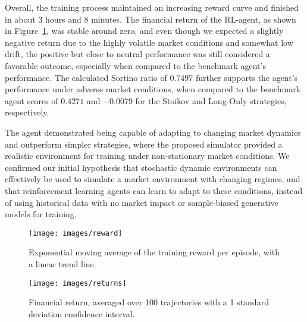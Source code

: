 
Overall, the training process maintained an increasing reward curve and finished in about 3 hours and 8 minutes.
The financial return of the RL-agent, as shown in Figure~\ref{fig:average-financial-return}, was stable around zero,
and even though we expected a slightly negative return due to the highly volatile market conditions and
somewhat low drift, the positive but close to neutral performance was still considered a favorable outcome,
especially when compared to the benchmark agent's performance.
The calculated Sortino ratio of $0.7497$ further supports the agent's performance under adverse market conditions,
when compared to the benchmark agent scores of $0.4271$ and $-0.0079$ for the Stoikov and Long-Only strategies, respectively.

The agent demonstrated being capable of adapting to changing market dynamics and outperform simpler strategies,
where the proposed simulator provided a realistic environment for training under non-stationary market conditions.
We confirmed our initial hypothesis that stochastic dynamic environments can effectively be used to simulate
a market environment with changing regimes, and that reinforcement learning agents can learn to adapt to these conditions,
instead of using historical data with no market impact or sample-biased generative models for training.

\begin{figure}[t]
    \centering
    \begin{minipage}{\columnwidth}
        \centering
        \texttt{[image: images/reward]}
        \caption{Exponential moving average of the training reward per episode, with a linear trend line.}
        \label{fig:average-reward-moving-average}
    \end{minipage}
    \vspace{0.04\textwidth} %
    \begin{minipage}{\columnwidth}
        \centering
        \texttt{[image: images/returns]}
        \caption{Financial return, averaged over 100 trajectories with a 1 standard deviation confidence interval.}
        \label{fig:average-financial-return}
    \end{minipage}
\end{figure}